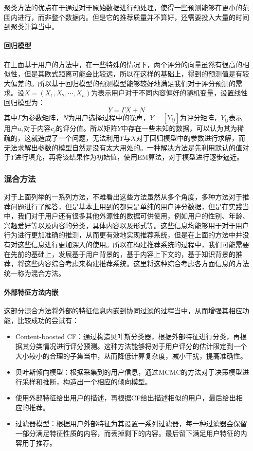 聚类方法的优点在于通过对于原始数据进行预处理，使得一些预测能够在更小的范围内进行，而非整个数据内。但是它的推荐质量并不算好，还需要投入大量的时间到聚类计算当中。

\paragraph{回归模型}
在上面基于用户的方法中，在一些特殊的情况下，两个评分的向量虽然有很高的相似性，但是其欧式距离可能会比较远，所以在这样的基础上，得到的预测值是有较大偏差的。所以基于回归模型的预测模型能够较好地满足我们对于评分预测的需求。设$X=(X_1, X_2, \cdots, X_n)$为表示用户对于不同内容偏好的随机变量，设置线性回归模型为：
\begin{equation}
    Y = \Gamma X + N
\end{equation}
其中$\Gamma$为参数矩阵，$N$为用户选择过程中的噪声，$Y = [Y_{ij}]$为评分矩阵，$Y_{ij}$表示用户$u_i$对于内容$c_j$的评分值。所以矩阵$Y$中存在一些未知的数据，可以认为其为稀疏的，这就造成了一个问题，无法利用$Y$与$X$对于回归模型中的参数进行求解，而无法求解出参数的模型自然是没有太大用处的。一种解决方法是先利用默认的值对于$Y$进行填充，再将该结果作为初始值，使用EM算法，对于模型进行逐步逼近\cite{Regression}。

\subsubsection{混合方法}
对于上面列举的一系列方法，不难看出这些方法虽然从多个角度，多种方法对于推荐问题进行了解答，但是基本上用到的都只是单纯的用户评分数据，但是在实践当中，我们对于用户还有很多其他外源性的数据可供使用，例如用户的性别、年龄、兴趣爱好等以及内容的分类，具体内容以及形式等。这些信息均能够用于对于用户行为进行更加准确的推测，从而更有效地实现推荐系统\cite{CBCF}，但是在上面的方法中并没有对这些信息进行更加深入的使用。所以在构建推荐系统的过程中，我们可能需要在先前的基础上，发展基于用户背景的，基于内容上下文的，基于知识背景的推荐，将这些内容综合考虑来构建推荐系统。这里将这种综合考虑各方面信息的方法统一称为混合方法\cite{Hybrid}。

\paragraph{外部特征方法内嵌}
这部分混合方法将外部的特征信息内嵌到协同过滤的过程当中，从而增强其相应功能，比较成功的尝试有：
\begin{itemize}
    \item Content-boosted CF\cite{ContentBoost}：通过构造贝叶斯分类器，根据外部特征进行分类，再根据其分类情况进行评分预测。这种方法能够将对于用户评分的估计限定到一个大小较小的合理的子集当中，从而降低计算复杂度，减小干扰，提高准确性。
    \item 贝叶斯倾向模型\cite{BayesPreference}：根据采集到的用户信息，通过MCMC的方法对于决策模型进行采样和推断，构造出一个相应的倾向模型。
    \item 使用外部特征给出用户的描述，再根据CF给出描述相似的用户，最后给出相应的推荐\cite{ProfilePreference}。
    \item 过滤器模型\cite{Agent}：根据用户外部特征为其设置一系列过滤器，每一种过滤器会保留一部分满足特征性质的内容，而丢掉剩下的内容。最后留下满足用户特征的内容用于推荐。
\end{itemize}

